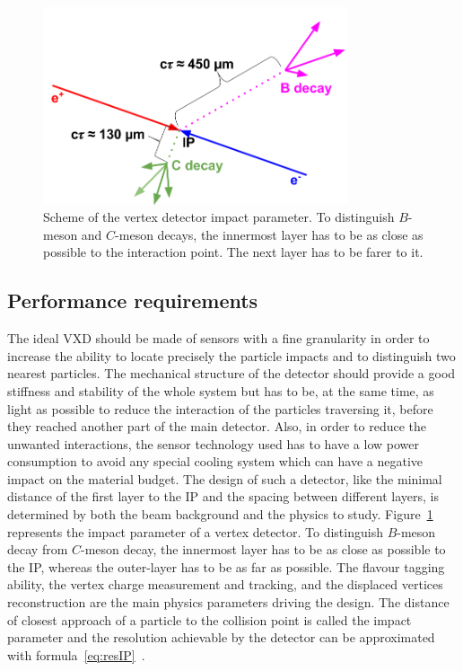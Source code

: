     \begin{figure}[!tbh]
      \centering
      \includegraphics[width = 0.8\textwidth]{Pictures/Higgs/ImpactParameter.png}
      \caption{Scheme of the vertex detector impact parameter. To distinguish $B$-meson and $C$-meson decays, the innermost layer has to be as close as possible to the interaction point. The next layer has to be farer to it.}
      \label{fig:IP}
    \end{figure}

   \subsection{Performance requirements}
   
   The ideal \gls{VXD} should be made of sensors with a fine granularity in order to increase the ability to locate precisely the particle impacts and to distinguish two nearest particles.
   The mechanical structure of the detector should provide a good stiffness and stability of the whole system but has to be, at the same time, as light as possible to reduce the interaction of the particles traversing it, before they reached another part of the main detector.
   Also, in order to reduce the unwanted interactions, the sensor technology used has to have a low power consumption to avoid any special cooling system which can have a negative impact on the material budget.
   The design of such a detector, like the minimal distance of the first layer to the \gls{IP} and the spacing between different layers, is determined by both the beam background and the physics to study.
   Figure~\ref{fig:IP} represents the impact parameter of a vertex detector.
   To distinguish $B$-meson decay from $C$-meson decay, the innermost layer has to be as close as possible to the \gls{IP}, whereas the outer-layer has to be as far as possible.
   The flavour tagging ability, the vertex charge measurement and tracking, and the displaced vertices reconstruction are the main physics parameters driving the design.
   The distance of closest approach of a particle to the collision point is called the impact parameter and the resolution achievable by the detector can be approximated with formula~\ref{eq:resIP}~\cite{Battaglia2011}.
    
